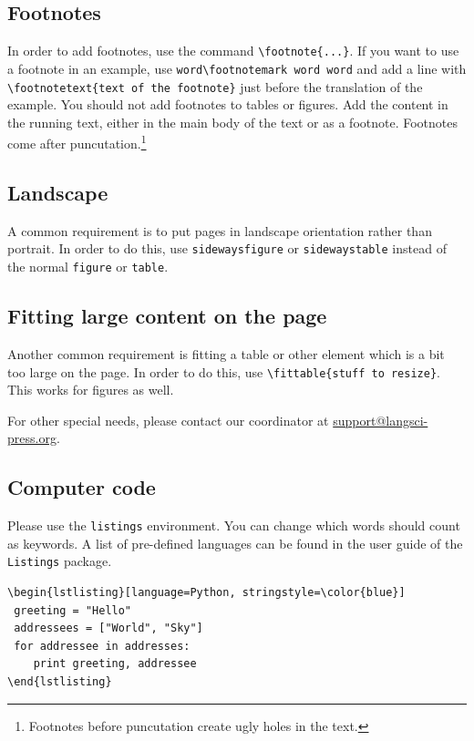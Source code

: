 \subsection{Footnotes}
In order to add footnotes, use the command \verb+\footnote{...}+. If you want to use a footnote in an example, use \verb+word\footnotemark word word+ and add a line with \verb+\footnotetext{text of the footnote}+ just before the translation of the example. You should not add footnotes to tables or figures. Add the content in the running text, either in the main body of the text or as a footnote. Footnotes come after puncutation.\footnote{Footnotes before puncutation create ugly holes in the text.}

\newpage
\subsection{Landscape}
 
A common requirement is to put pages in landscape orientation rather than portrait. In order to do this, use \verb+sidewaysfigure+ or \verb+sidewaystable+ instead of the normal \verb+figure+ or \verb+table+.

\subsection{Fitting large content on the page}
Another common requirement is fitting a table or other element which is a bit too large on the page. In order to do this, use \verb+\fittable{stuff to resize}+. This works for figures as well. 

For other special needs, please contact our coordinator at \url{support@langsci-press.org}. 

\subsection{Computer code}
Please use the \verb+listings+ environment. You can change which words should count as keywords. A list of pre-defined languages can be found in the user guide of the \verb+Listings+ package.

\begin{verbatim}
\begin{lstlisting}[language=Python, stringstyle=\color{blue}]
 greeting = "Hello"
 addressees = ["World", "Sky"]
 for addressee in addresses:
    print greeting, addressee
\end{lstlisting}
\end{verbatim}
 

